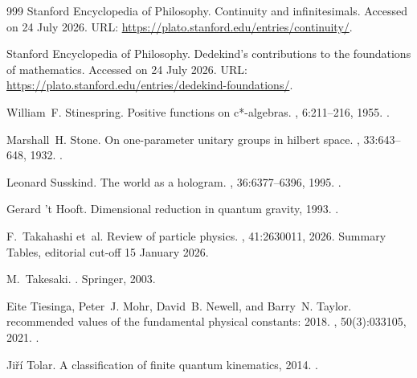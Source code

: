 \begin{thebibliography}{999}
{Stanford Encyclopedia of Philosophy}.
\newblock Continuity and infinitesimals.
\newblock Accessed on 24 July 2026.
\newblock URL: \url{https://plato.stanford.edu/entries/continuity/}.

{Stanford Encyclopedia of Philosophy}.
\newblock Dedekind's contributions to the foundations of mathematics.
\newblock Accessed on 24 July 2026.
\newblock URL: \url{https://plato.stanford.edu/entries/dedekind-foundations/}.

William~F. Stinespring.
\newblock Positive functions on c*-algebras.
, 6:211--216,
  1955.
\newblock \href {https://doi.org/10.1090/S0002-9939-1955-0069403-4}
  {}.

Marshall~H. Stone.
\newblock On one-parameter unitary groups in hilbert space.
, 33:643--648, 1932.
\newblock \href {https://doi.org/10.2307/1968538} {}.

Leonard Susskind.
\newblock The world as a hologram.
, 36:6377--6396, 1995.
\newblock \href {https://arxiv.org/abs/hep-th/9409089}
  {}.

Gerard {'t Hooft}.
\newblock Dimensional reduction in quantum gravity, 1993.
\newblock \href {https://arxiv.org/abs/gr-qc/9310026}
  {}.

F.~Takahashi et~al.
\newblock Review of particle physics.
, 41:2630011, 2026.
\newblock Summary Tables, editorial cut-off 15 January 2026.

M.~Takesaki.
.
\newblock Springer, 2003.

Eite Tiesinga, Peter~J. Mohr, David~B. Newell, and Barry~N. Taylor.
 recommended values of the fundamental physical constants:
  2018.
, 50(3):033105,
  2021.
\newblock \href {https://doi.org/10.1063/5.0064853}
  {}.

Ji\v{r}\'i Tolar.
\newblock A classification of finite quantum kinematics, 2014.
\newblock \href {https://arxiv.org/abs/1411.6390} {}.


\end{thebibliography}
